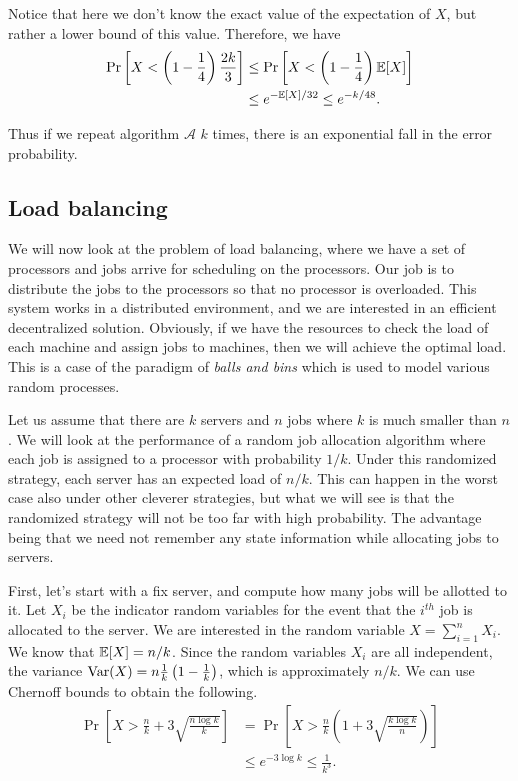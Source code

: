 Notice that here we don't know the exact value of the expectation of $X$, but rather a lower bound of this value. Therefore, we have
\begin{align*}
	\Pr\left[ X < \left(1 - \frac{1}{4}\right) \frac{2k}{3} \right] &\leq \Pr\left[ X < \left(1 - \frac{1}{4}\right) \mathbb{E}[X] \right]\\
	&\leq e^{-\mathbb{E}[X]/32} \leq e^{-k/48}. 
\end{align*}

Thus if we repeat algorithm $\mathcal{A}$ $k$ times, there is an exponential fall in the error probability.

\subsection{Load balancing}

We will now look at the problem of load balancing, where we have a set of processors and jobs arrive for scheduling on the processors. Our job is to distribute the jobs to the processors so that no processor is overloaded. This system works in a distributed environment, and we are interested in an efficient decentralized solution. Obviously, if we have the resources to check the load of each machine and assign jobs to machines, then we will achieve the optimal load. This is a case of the paradigm of \emph{balls and bins} which is used to model various random processes.

Let us assume that there are $k$ servers and $n$ jobs where $k$ is much smaller than $n$. We will look at the performance of a random job allocation algorithm where each job is assigned to a processor with probability $1/k$. Under this randomized strategy, each server has an expected load of $n/k$. This can happen in the worst case also under other cleverer strategies, but what we will see is that the randomized strategy will not be too far with high probability. The advantage being that we need not remember any state information while allocating jobs to servers. 

First, let's start with a fix server, and compute how many jobs will be allotted to it. Let $X_i$ be the indicator random variables for the event that the $i^{th}$ job is allocated to the server. We are interested in the random variable $X = \sum_{i=1}^n X_i$. We know that $\mathbb{E}[X] = n/k$. Since the random variables $X_i$ are all independent, the variance $\operatorname{Var}(X) = n\frac{1}{k}\left(1 - \frac{1}{k} \right)$, which is approximately $n/k$. We can use Chernoff bounds to obtain the following.
\begin{align*}
	\Pr\left[ X > \frac{n}{k} + 3\sqrt{\frac{n\log k}{k}} \right] &= \Pr \left[ X > \frac{n}{k}\left( 1 + 3\sqrt{\frac{k\log k}{n}} \right) \right] \\
	& \leq e^{-3\log k} \leq \frac{1}{k^3}.
\end{align*}

